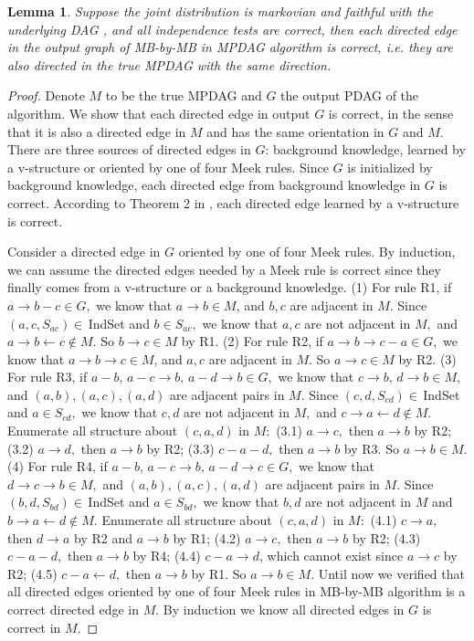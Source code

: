 \documentclass{article}
\newtheorem{lemma}{Lemma}
\begin{document}
\begin{lemma}
\label{lemma:sound}
Suppose the joint distribution is markovian and faithful with the underlying DAG , and all independence tests are correct, then each directed edge in the output graph of MB-by-MB in MPDAG algorithm is correct, i.e. they are also directed in the true MPDAG with the same direction.
\end{lemma}
\begin{proof}
Denote $M$ to be the true MPDAG and $G$ the output PDAG of the algorithm. We show that each directed edge in output $G$ is correct, in the sense that it is also a directed edge in $M$ and has the same orientation in $G$ and $M.$ There are three sources of directed edges in $G$: background knowledge, learned by a v-structure or oriented by one of four Meek rules. Since $G$ is initialized by background knowledge, each directed edge from background knowledge in $G$ is correct. According to Theorem 2 in \citep{wang2014discovering}, each directed edge learned by a v-structure is correct.

Consider a directed edge in $G$ oriented by one of four Meek rules. By induction, we can assume the directed edges needed by a Meek rule is correct since they finally comes from a v-structure or a background knowledge. (1) For rule R1, if $a\to b-c \in G,$ we know that $a\to b\in M$, and $b,c$ are adjacent in $M.$ Since $(a,c,S_{ac})\in\,$IndSet and $b\in S_{ac},$ we know that $a,c$ are not adjacent in $M,$ and $a\to b\leftarrow c\not\in M.$ So $b\to c\in M$ by R1. (2) For rule R2, if $a\to b\to c-a\in G,$ we know that $a\to b\to c\in M$, and $a,c$ are adjacent in $M.$ So $a\to c\in M$ by R2. (3) For rule R3, if $a-b,\,a-c\to b,\,a-d\to b\in G,$ we know that $c\to b,\,d\to b\in M,$ and $(a,b),(a,c),(a,d)$ are adjacent pairs in $M.$ Since $(c,d,S_{cd})\in\,$IndSet and $a\in S_{cd},$ we know that $c,d$ are not adjacent in $M,$ and $c\to a\leftarrow d\not\in M.$ Enumerate all structure about $(c,a,d)$ in $M:$ (3.1) $a\to c,$ then $a\to b$ by R2; (3.2) $a\to d,$ then $a\to b$ by R2; (3.3) $c-a-d,$ then $a\to b$ by R3. So $a\to b\in M.$ (4) For rule R4, if $a-b,\,a-c\to b,\,a-d\to c\in G,$ we know that $d\to c\to b\in M,$ and $(a,b),(a,c),(a,d)$ are adjacent pairs in $M.$ Since $(b,d,S_{bd})\in\,$IndSet and $a\in S_{bd},$ we know that $b,d$ are not adjacent in $M$ and $b\to a\leftarrow d\not\in M.$ Enumerate all structure about $(c,a,d)$ in $M:$ (4.1) $c\to a,$ then $d\to a$ by R2 and $a\to b$ by R1; (4.2) $a\to c,$ then $a\to b$ by R2; (4.3) $c-a-d,$ then $a\to b$ by R4; (4.4) $c-a\to d$, which cannot exist since $a\to c$ by R2; (4.5) $c-a\leftarrow d,$ then $a\to b$ by R1. So $a\to b\in M.$ Until now we verified that all directed edges oriented by one of four Meek rules in MB-by-MB algorithm is a correct directed edge in $M.$ By induction we know all directed edges in $G$ is correct in $M.$
\end{proof}
\end{document}
